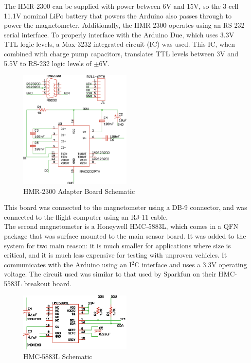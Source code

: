The HMR-2300 can be supplied with power between 6V and 15V, so the 3-cell 11.1V nominal LiPo battery that powers the Arduino also passes through to power the magnetometer. Additionally, the HMR-2300 operates using an RS-232 serial interface. To properly interface with the Arduino Due, which uses 3.3V TTL logic levels, a Max-3232 integrated circuit (IC) was used. This IC, when combined with charge pump capacitors, translates TTL levels between 3V and 5.5V to RS-232 logic levels of $\pm6$V.
 \begin{figure}[H]
   \caption{HMR-2300 Adapter Board Schematic} \label{magBoardSchematic}
   \centering
     \includegraphics[width=0.5\textwidth]{figures/magBoard.eps}
 \end{figure}
 This board was connected to the magnetometer using a DB-9 connector, and was connected to the flight computer using an RJ-11 cable.\\
 
 The second magnetometer is a Honeywell HMC-5883L, which comes in a QFN package that was surface mounted to the main sensor board. It was added to the system for two main reason: it is much smaller for applications where size is critical, and it is much less expensive for testing with unproven vehicles. It communicates with the Arduino using an I$^2$C interface and uses a 3.3V operating voltage\cite{hmc5883LDatasheet}. The circuit used was similar to that used by Sparkfun on their HMC-5583L breakout board\cite{hmc5883LSchematic}.
 
 \begin{figure}[h!]
   \caption{HMC-5883L Schematic} \label{hmc5883LSchematic}
   \centering
     \includegraphics[width=0.5\textwidth]{figures/hmc5883LSchematic.eps}
 \end{figure}
 
